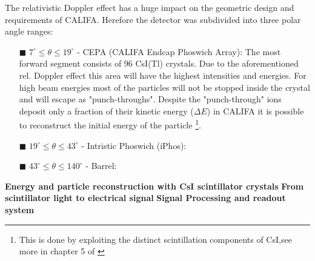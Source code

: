 The relativistic Doppler effect has a huge impact on the geometric design and requirements of CALIFA. Herefore the detector was subdivided into three polar angle ranges:
\begin{enumerate}
\item[$\blacksquare$] $7^{\circ} \leq \theta \leq 19^{\circ}$ - CEPA (CALIFA Endcap Phoswich Array): The most forward segment consists of 96 CsI(Tl) crystals. Due to the aforementioned rel. Doppler effect this area will have the highest intensities and energies. For high beam energies most of the particles will not be stopped inside the crystal and will escape as "punch-throughs". Despite the "punch-through" ions deposit only a fraction of their kinetic energy ($\Delta E$) in CALIFA it is possible to reconstruct the initial energy of the particle \footnote{This is done by exploiting the distinct scintillation components of CsI,see more in chapter 5 of \cite{Bendel:98055}}.     
\item[$\blacksquare$] $19^{\circ} \leq \theta \leq 43^{\circ}$ - Intristic Phoswich (iPhos):
\item[$\blacksquare$] $43^{\circ} \leq \theta \leq 140^{\circ}$ - Barrel:

\end{enumerate}
\textbf{Energy and particle reconstruction with CsI scintillator crystals}\newline
\textbf{From scintillator light to electrical signal}\newline
\textbf{Signal Processing and readout system}\newline
